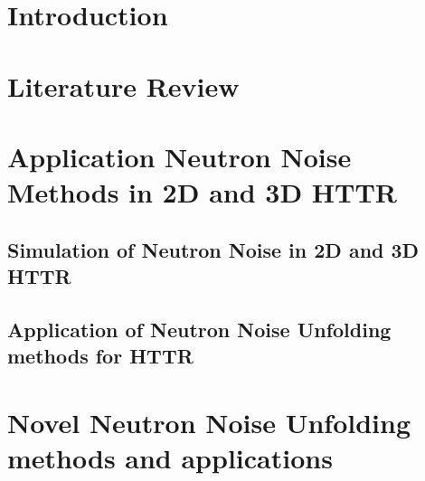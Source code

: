 \documentclass{uiucthesis2021}
\begin{document}
%
%
%

\mainmatter

\chapter{Introduction}


\chapter{Literature Review}



\chapter{Application Neutron Noise Methods in 2D and 3D HTTR}

\section{Simulation of Neutron Noise in 2D and 3D HTTR}

\section{Application of Neutron Noise Unfolding methods for HTTR}


\chapter{Novel Neutron Noise Unfolding methods and applications}
\end{document}
